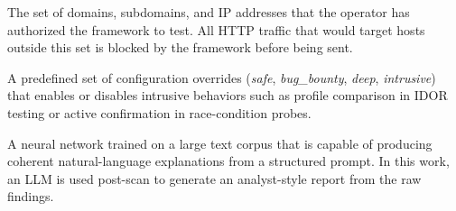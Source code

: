 \begin{description}[style=multiline, labelwidth=4.2cm, leftmargin=4.6cm]
  \item[scope]
       The set of domains, subdomains, and IP addresses that the operator has authorized the framework to test. All HTTP traffic that would target hosts outside this set is blocked by the framework before being sent.

  \item[scan profile]
       A predefined set of configuration overrides (\textit{safe}, \textit{bug\_bounty}, \textit{deep}, \textit{intrusive}) that enables or disables intrusive behaviors such as profile comparison in IDOR testing or active confirmation in race-condition probes.

  \item[Large Language Model (LLM)]
       A neural network trained on a large text corpus that is capable of producing coherent natural-language explanations from a structured prompt. In this work, an LLM is used post-scan to generate an analyst-style report from the raw findings.

\end{description}
